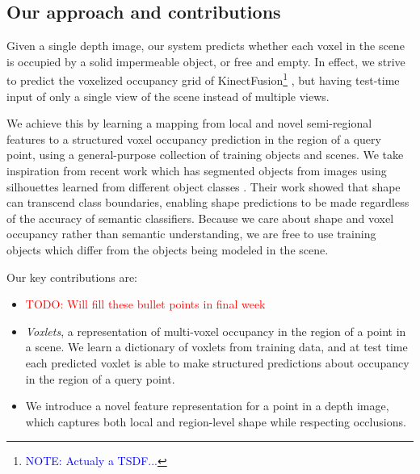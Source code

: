 \documentclass[10pt,twocolumn,letterpaper]{article}
\newcommand{\todo}[1]{\textcolor{red}{TODO: #1}}
\newcommand{\note}[1]{\textcolor{blue}{NOTE: #1}}
\begin{document}
\subsection{Our approach and contributions}


Given a single depth image, our system predicts whether each voxel in the scene is occupied by a solid impermeable object, or free and empty.
In effect, we strive to predict the voxelized occupancy grid of KinectFusion\footnote{\note{Actualy a TSDF...}} \cite{izadi-uist-2011}, but having test-time input of only a single view of the scene instead of multiple views.

We achieve this by learning a mapping from local and novel semi-regional features to a structured voxel occupancy prediction in the region of a query point, using a general-purpose collection of training objects and scenes.
We take inspiration from recent work which has segmented objects from images using silhouettes learned from different object classes \cite{kim-eccv-2012}.
Their work showed that shape can transcend class boundaries, enabling shape predictions to be made regardless of the accuracy of semantic classifiers.
Because we care about shape and voxel occupancy rather than semantic understanding, we are free to use training objects which differ from the objects being modeled in the scene.

Our key contributions are:

\begin{itemize}
\item \todo{Will fill these bullet points in final week}
\item \emph{Voxlets}, a representation of multi-voxel occupancy in the region of a point in a scene. 
We learn a dictionary of voxlets from training data, and at test time each predicted voxlet is able to make structured predictions about occupancy in the region of a query point.
\item We introduce a novel feature representation for a point in a depth image, which captures both local and region-level shape while respecting occlusions.
\end{itemize}
\end{document}
